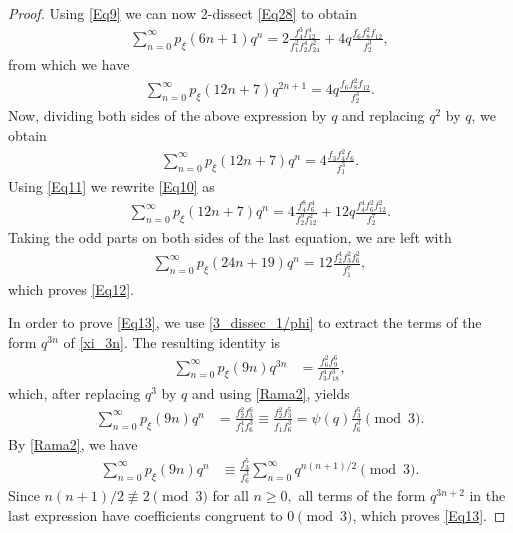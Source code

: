 \documentclass[12pt]{article}
\begin{document}
\begin{proof} Using \eqref{Eq9} we can now 2-dissect \eqref{Eq28} to obtain
\begin{align*}
\sum_{n=0}^{\infty} p_{\xi}(6n+1)q^{n} = 2\displaystyle\frac{f_{4}^3f_{12}^4}{f_{1}^{2}f_{2}^4f_{24}^2} + 4q\displaystyle\frac{f_{6}f_{8}^2f_{12}}{f_{2}^3},
\end{align*}
from which we have
\begin{align*}
\sum_{n=0}^{\infty} p_{\xi}(12n+7)q^{2n+1} = 4q\displaystyle\frac{f_{6}f_{8}^2f_{12}}{f_{2}^3}.
\end{align*}
Now, dividing both sides of the above expression by $q$ and replacing $q^2$ by $q$, we obtain
\begin{align}
\sum_{n=0}^{\infty} p_{\xi}(12n+7)q^{n} = 4\displaystyle\frac{f_{3}f_{4}^2f_{6}}{f_{1}^3}.
\label{Eq10}
\end{align}
Using \eqref{Eq11} we rewrite \eqref{Eq10} as
\begin{align*}
\sum_{n=0}^{\infty} p_{\xi}(12n+7)q^{n} = 4\displaystyle\frac{f_{4}^8f_{6}^4}{f_{2}^{9}f_{12}^2} + 12q\displaystyle\frac{f_{4}^4f_{6}^2f_{12}^2}{f_{2}^{7}}.
\end{align*}
Taking the odd parts on both sides of the last equation, we are left with
\begin{align*}
\sum_{n=0}^{\infty} p_{\xi}(24n+19)q^{n} = 12\displaystyle\frac{f_{2}^4f_{3}^2f_{6}^2}{f_{1}^{7}},
\end{align*}
which proves \eqref{Eq12}.

In order to prove \eqref{Eq13}, we use \eqref{3_dissec_1/phi} to extract the terms of the form $q^{3n}$ of \eqref{xi_3n}. The resulting identity is
\begin{align*}
\sum_{n=0}^{\infty} p_{\xi}(9n)q^{3n} & = \frac{f_{6}^2f_{9}^6}{f_{3}^4f_{18}^3},
\end{align*}
which, after replacing $q^3$ by $q$ and using \eqref{Rama2}, yields
\begin{align*}
\sum_{n=0}^{\infty} p_{\xi}(9n)q^{n} & = \frac{f_{2}^2f_{3}^6}{f_{1}^4f_{6}^3} \equiv \frac{f_{2}^2f_{3}^5}{f_{1}f_{6}^3}  = \psi(q)\frac{f_{3}^5}{f_{6}^3} \pmod{3}.
\end{align*}
By \eqref{Rama2}, we have
\begin{align*}
\sum_{n=0}^{\infty} p_{\xi}(9n)q^{n} & \equiv \frac{f_{3}^5}{f_{6}^3} \sum_{n=0}^{\infty} q^{n(n+1)/2} \pmod{3}.
\end{align*}
Since $n(n+1)/2 \not\equiv 2 \pmod{3}$ for all $n\geq 0,$  all terms of the form $q^{3n+2}$ in the last expression have coefficients congruent to $0 \pmod{3}$, which proves \eqref{Eq13}.


\end{proof}
\end{document}
